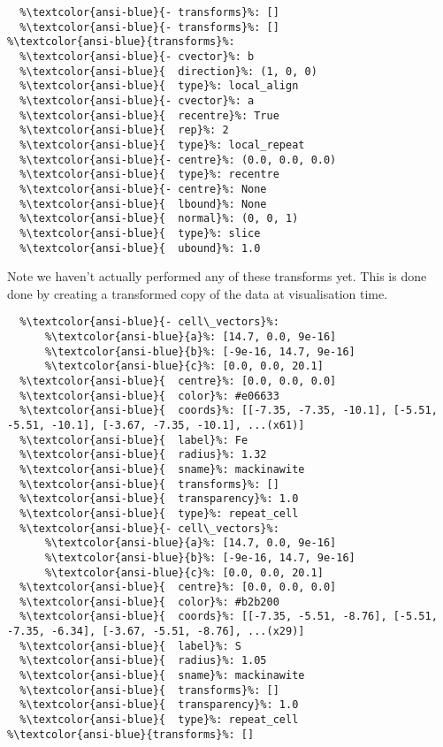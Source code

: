 \documentclass[10pt,parskip=half,
	toc=sectionentrywithdots,
	bibliography=totocnumbered,
	captions=tableheading,numbers=noendperiod]{scrartcl}
\begin{document}
\begin{lstlisting}[language={},postbreak={},numbers=none,xrightmargin=7pt,belowskip=5pt,aboveskip=5pt,breakindent=0pt,escapechar=\%]
%\textcolor{ansi-blue}{elements}%: 
  %\textcolor{ansi-blue}{- transforms}%: []
  %\textcolor{ansi-blue}{- transforms}%: []
%\textcolor{ansi-blue}{transforms}%: 
  %\textcolor{ansi-blue}{- cvector}%: b
  %\textcolor{ansi-blue}{  direction}%: (1, 0, 0)
  %\textcolor{ansi-blue}{  type}%: local_align
  %\textcolor{ansi-blue}{- cvector}%: a
  %\textcolor{ansi-blue}{  recentre}%: True
  %\textcolor{ansi-blue}{  rep}%: 2
  %\textcolor{ansi-blue}{  type}%: local_repeat
  %\textcolor{ansi-blue}{- centre}%: (0.0, 0.0, 0.0)
  %\textcolor{ansi-blue}{  type}%: recentre
  %\textcolor{ansi-blue}{- centre}%: None
  %\textcolor{ansi-blue}{  lbound}%: None
  %\textcolor{ansi-blue}{  normal}%: (0, 0, 1)
  %\textcolor{ansi-blue}{  type}%: slice
  %\textcolor{ansi-blue}{  ubound}%: 1.0

\end{lstlisting}

Note we haven't actually performed any of these transforms yet. This is
done done by creating a transformed copy of the data at visualisation
time.

\begin{lstlisting}[language={},postbreak={},numbers=none,xrightmargin=7pt,belowskip=5pt,aboveskip=5pt,breakindent=0pt,escapechar=\%]
%\textcolor{ansi-blue}{elements}%: 
  %\textcolor{ansi-blue}{- cell\_vectors}%: 
      %\textcolor{ansi-blue}{a}%: [14.7, 0.0, 9e-16]
      %\textcolor{ansi-blue}{b}%: [-9e-16, 14.7, 9e-16]
      %\textcolor{ansi-blue}{c}%: [0.0, 0.0, 20.1]
  %\textcolor{ansi-blue}{  centre}%: [0.0, 0.0, 0.0]
  %\textcolor{ansi-blue}{  color}%: #e06633
  %\textcolor{ansi-blue}{  coords}%: [[-7.35, -7.35, -10.1], [-5.51, -5.51, -10.1], [-3.67, -7.35, -10.1], ...(x61)]
  %\textcolor{ansi-blue}{  label}%: Fe
  %\textcolor{ansi-blue}{  radius}%: 1.32
  %\textcolor{ansi-blue}{  sname}%: mackinawite
  %\textcolor{ansi-blue}{  transforms}%: []
  %\textcolor{ansi-blue}{  transparency}%: 1.0
  %\textcolor{ansi-blue}{  type}%: repeat_cell
  %\textcolor{ansi-blue}{- cell\_vectors}%: 
      %\textcolor{ansi-blue}{a}%: [14.7, 0.0, 9e-16]
      %\textcolor{ansi-blue}{b}%: [-9e-16, 14.7, 9e-16]
      %\textcolor{ansi-blue}{c}%: [0.0, 0.0, 20.1]
  %\textcolor{ansi-blue}{  centre}%: [0.0, 0.0, 0.0]
  %\textcolor{ansi-blue}{  color}%: #b2b200
  %\textcolor{ansi-blue}{  coords}%: [[-7.35, -5.51, -8.76], [-5.51, -7.35, -6.34], [-3.67, -5.51, -8.76], ...(x29)]
  %\textcolor{ansi-blue}{  label}%: S
  %\textcolor{ansi-blue}{  radius}%: 1.05
  %\textcolor{ansi-blue}{  sname}%: mackinawite
  %\textcolor{ansi-blue}{  transforms}%: []
  %\textcolor{ansi-blue}{  transparency}%: 1.0
  %\textcolor{ansi-blue}{  type}%: repeat_cell
%\textcolor{ansi-blue}{transforms}%: []

\end{lstlisting}
\end{document}
